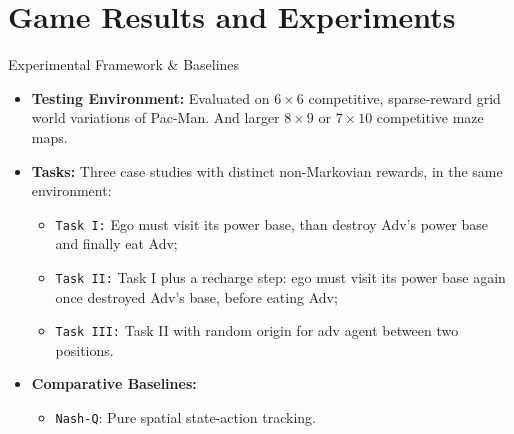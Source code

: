 \documentclass[10pt, aspectratio=169]{beamer}
\begin{document}

\section{Game Results and Experiments}

\begin{frame}{Experimental Framework \& Baselines}
    \begin{itemize}
        \item \textbf{Testing Environment:} Evaluated on $6\times6$ competitive, sparse-reward grid world variations of Pac-Man. And larger $8\times9$ or $7\times10$ competitive maze maps.
        \item \textbf{Tasks:} Three case studies with distinct non-Markovian rewards, in the same environment:
        \begin{itemize}
            \item \texttt{Task I:} Ego must visit its power base, than destroy Adv's power base and finally eat Adv;
            \item \texttt{Task II:} Task I plus a recharge step: ego must visit its power base again once destroyed Adv's base, before eating Adv;
            \item \texttt{Task III:} Task II with random origin for adv agent between two positions.
        \end{itemize}
        \item \textbf{Comparative Baselines:}
        \begin{itemize}
            \item \texttt{Nash-Q}: Pure spatial state-action tracking.
        \end{itemize}
    \end{itemize}
\end{frame}
\end{document}
